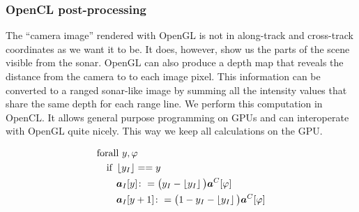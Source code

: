
\subsubsection{OpenCL post-processing}

The ``camera image'' rendered with OpenGL is not in along-track and cross-track coordinates as we want it to be. It does, however, show us the parts of the scene visible from the sonar. OpenGL can also produce a depth map that reveals the distance from the camera to to each image pixel. This information can be converted to a ranged sonar-like image by summing all the intensity values that share the same depth for each range line. We perform this computation in OpenCL. It allows general purpose programming on GPUs and can interoperate with OpenGL quite nicely. This way we keep all calculations on the GPU.

\begin{align}
&\text{forall } y,\varphi \nonumber\\
&\quad\text{if }\left\lfloor y_I\right\rfloor == y \nonumber\\
&\qquad\boldsymbol{a}_I[y] \colon= \big(y_I - \left\lfloor y_I\right\rfloor\big)\boldsymbol{a}^C[\varphi] \nonumber\\
&\qquad\boldsymbol{a}_I[y+1] \colon= \big(1 - y_I - \left\lfloor y_I\right\rfloor\big)\boldsymbol{a}^C[\varphi]
\end{align}



